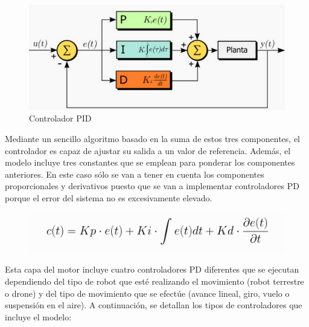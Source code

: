 \begin{figure}[h!]
    \centering
    \includegraphics[scale=0.7]{pid.png}
    \caption{Controlador PID \footnotemark}
    \label{fig:pid}
\end{figure}

Mediante un sencillo algoritmo basado en la suma de estos tres componentes, el controlador es capaz de ajustar su salida a un valor de referencia. Además, el modelo incluye tres constantes que se emplean para ponderar los componentes anteriores. En este caso sólo se van a tener en cuenta los componentes proporcionales y derivativos puesto que se van a implementar controladores PD  porque el error del sistema no es excesivamente elevado.\newline 

\begin{figure}[h!]
    \centering
    \includegraphics[scale=0.5]{pid_form.png}
    \label{fig:pid_form}
\end{figure}

Esta capa del motor incluye cuatro controladores PD diferentes que se ejecutan dependiendo del tipo de robot que esté realizando el movimiento (robot terrestre o drone) y del tipo de movimiento que se efectúe (avance lineal, giro, vuelo o suspensión en el aire). A continuación, se detallan los tipos de controladores que incluye el modelo:

